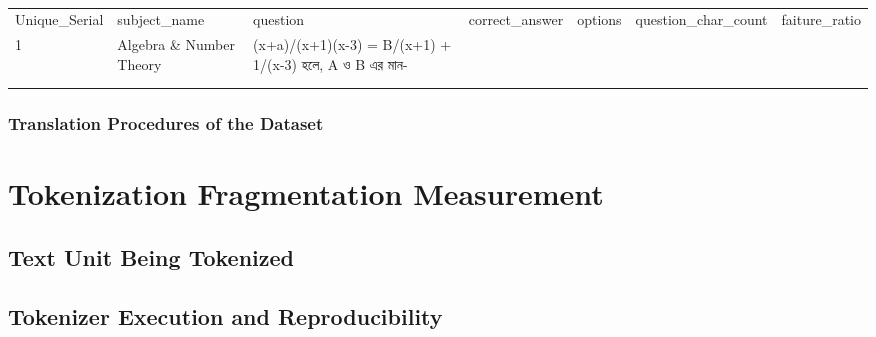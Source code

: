 \documentclass[runningheads]{llncs}
\begin{document}
\begin{table}[]
	\centering
	\begin{tabular}{@{}lllllll@{}}
		\cmidrule(r){1-5}
		Unique\_Serial & subject\_name            & question                                              & correct\_answer & options & question\_char\_count & faiture\_ratio \\ \cmidrule(r){1-5}
		1              & Algebra \& Number Theory & (x+a)/(x+1)(x-3) = B/(x+1) + 1/(x-3) হলে, A ও B এর মান- &                 &         &                       &                \\
		               &                          &                                                       &                 &         &                       &                \\
		               &                          &                                                       &                 &         &                       &                \\ \cmidrule(r){1-5}
	\end{tabular}
	\caption{}
	\label{tab:my-table}
\end{table}

\subsubsection{Translation Procedures of the Dataset}

\section{Tokenization Fragmentation Measurement}

\subsection{Text Unit Being Tokenized}

\subsection{Tokenizer Execution and Reproducibility}
\end{document}
